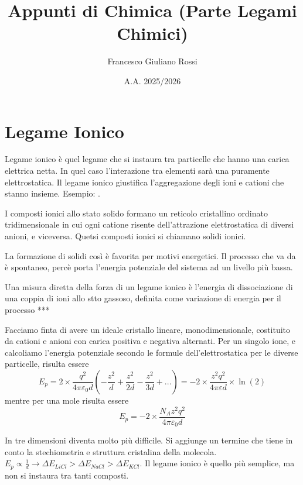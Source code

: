 \documentclass[a4paper]{article}
\title{Appunti di Chimica (Parte Legami Chimici)}
\author{Francesco Giuliano Rossi}
\date{A.A. 2025/2026}
\begin{document}
\maketitle
\tableofcontents
\newpage

\section{Legame Ionico}
Legame ionico è quel legame che si instaura tra particelle che hanno una carica elettrica netta. In quel caso l'interazione tra elementi sarà una puramente elettrostatica. Il legame ionico giustifica l'aggregazione degli ioni e cationi che stanno insieme. Esempio: . 

I composti ionici allo stato solido formano un reticolo cristallino
ordinato tridimensionale in cui ogni catione risente dell'attrazione
elettrostatica di diversi anioni, e viceversa. Quetsi composti ionici si chiamano solidi ionici. 

La formazione di solidi così è favorita per motivi energetici. Il processo che va da  è spontaneo, percè porta l'energia potenziale del sistema ad un livello più bassa. 

Una misura diretta della forza di un legame ionico è l'energia di dissociazione di una coppia di ioni allo stto gassoso, definita come variazione di energia per il processo 
***

Facciamo finta di avere un ideale cristallo lineare, monodimensionale, costituito da cationi e anioni con carica positiva e negativa alternati. Per un singolo ione, e calcoliamo l'energia potenziale secondo le formule dell'elettrostatica per le diverse particelle, risulta essere 
\begin{equation*}
    E_p = 2 \times \frac{q^2}{4\pi \varepsilon_0 d} (-\frac{z^2}{d} + \frac{z^2}{2d} - \frac{z^2}{3d} + ...) = -2 \times \frac{z^2 q^2}{4 \pi \varepsilon d} \times \ln(2)
\end{equation*}
mentre per una mole risulta essere 
\begin{equation*}
    E_p = -2 \times \frac{N_A z^2 q^2}{4 \pi \varepsilon_0 d}
\end{equation*}

In tre dimensioni diventa molto più difficile. Si aggiunge un termine che tiene in conto la stechiometria e struttura cristalina della molecola. $E_p \propto \frac{1}{d} \rightarrow \Delta E_{LiCl} > \Delta E_{NaCl} > \Delta E_{KCl}$. Il legame ionico è quello più semplice, ma non si instaura tra tanti composti. 
\end{document}
